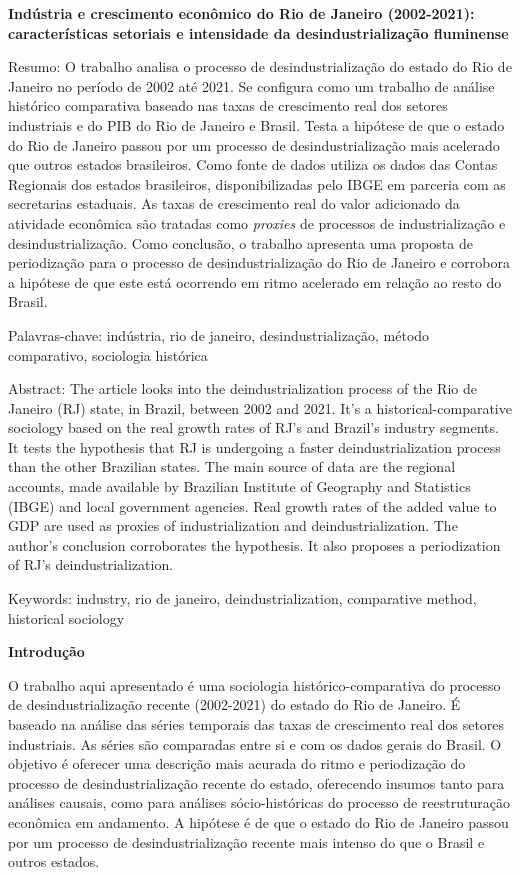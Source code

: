 \textbf{Indústria e crescimento econômico do Rio de Janeiro (2002-2021):
características setoriais e intensidade da desindustrialização
fluminense}

Resumo: O trabalho analisa o processo de desindustrialização do estado
do Rio de Janeiro no período de 2002 até 2021. Se configura como um
trabalho de análise histórico comparativa baseado nas taxas de
crescimento real dos setores industriais e do PIB do Rio de Janeiro e
Brasil. Testa a hipótese de que o estado do Rio de Janeiro passou por um
processo de desindustrialização mais acelerado que outros estados
brasileiros. Como fonte de dados utiliza os dados das Contas Regionais
dos estados brasileiros, disponibilizadas pelo IBGE em parceria com as
secretarias estaduais. As taxas de crescimento real do valor adicionado
da atividade econômica são tratadas como \emph{proxies} de processos de
industrialização e desindustrialização. Como conclusão, o trabalho
apresenta uma proposta de periodização para o processo de
desindustrialização do Rio de Janeiro e corrobora a hipótese de que este
está ocorrendo em ritmo acelerado em relação ao resto do Brasil.

Palavras-chave: indústria, rio de janeiro, desindustrialização, método
comparativo, sociologia histórica

Abstract: The article looks into the deindustrialization process of the
Rio de Janeiro (RJ) state, in Brazil, between 2002 and 2021. It's a
historical-comparative sociology based on the real growth rates of RJ's
and Brazil's industry segments. It tests the hypothesis that RJ is
undergoing a faster deindustrialization process than the other Brazilian
states. The main source of data are the regional accounts, made
available by Brazilian Institute of Geography and Statistics (IBGE) and
local government agencies. Real growth rates of the added value to GDP
are used as proxies of industrialization and deindustrialization. The
author's conclusion corroborates the hypothesis. It also proposes a
periodization of RJ's deindustrialization.

Keywords: industry, rio de janeiro, deindustrialization, comparative
method, historical sociology

\textbf{Introdução}

O trabalho aqui apresentado é uma sociologia histórico-comparativa do
processo de desindustrialização recente (2002-2021) do estado do Rio de
Janeiro. É baseado na análise das séries temporais das taxas de
crescimento real dos setores industriais. As séries são comparadas entre
si e com os dados gerais do Brasil. O objetivo é oferecer uma descrição
mais acurada do ritmo e periodização do processo de desindustrialização
recente do estado, oferecendo insumos tanto para análises causais, como
para análises sócio-históricas do processo de reestruturação econômica
em andamento. A hipótese é de que o estado do Rio de Janeiro passou por
um processo de desindustrialização recente mais intenso do que o Brasil
e outros estados.

